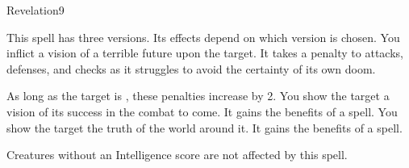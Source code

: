 \begin{spellsection}{Revelation}{9}
\begin{spellheader}
    \spellrng{\rngmed}
\end{spellheader}
\begin{spellcontent}
    \begin{spelltargetinginfo}
    \end{spelltargetinginfo}
    \begin{spelleffects}
        \spellspecial This spell has three versions. Its effects depend on which version is chosen.
         You inflict a vision of a terrible future upon the target. It takes a  penalty to attacks, defenses, and checks as it struggles to avoid the certainty of its own doom.

        As long as the target is \bloodied, these penalties increase by 2.
         You show the target a vision of its success in the combat to come. It gains the benefits of a  spell.
         You show the target the truth of the world around it. It gains the benefits of a  spell.
        \spelldur \durshort
    \end{spelleffects}
\end{spellcontent}
\begin{spellfooter}
    \spellnotes Creatures without an Intelligence score are not affected by this spell.
\end{spellfooter}
\end{spellsection}

